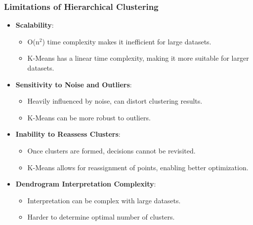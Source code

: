 \documentclass[aspectratio=169]{beamer}
\begin{document}
\begin{frame}[fragile]
    \frametitle{Limitations of Hierarchical Clustering}
    
    \begin{itemize}
        \item \textbf{Scalability}:
        \begin{itemize}
            \item O(n$^2$) time complexity makes it inefficient for large datasets.
            \item K-Means has a linear time complexity, making it more suitable for larger datasets.
        \end{itemize}
        
        \item \textbf{Sensitivity to Noise and Outliers}:
        \begin{itemize}
            \item Heavily influenced by noise, can distort clustering results.
            \item K-Means can be more robust to outliers.
        \end{itemize}
        
        \item \textbf{Inability to Reassess Clusters}:
        \begin{itemize}
            \item Once clusters are formed, decisions cannot be revisited.
            \item K-Means allows for reassignment of points, enabling better optimization.
        \end{itemize}
        
        \item \textbf{Dendrogram Interpretation Complexity}:
        \begin{itemize}
            \item Interpretation can be complex with large datasets.
            \item Harder to determine optimal number of clusters.
        \end{itemize}
    \end{itemize}
\end{frame}
\end{document}
